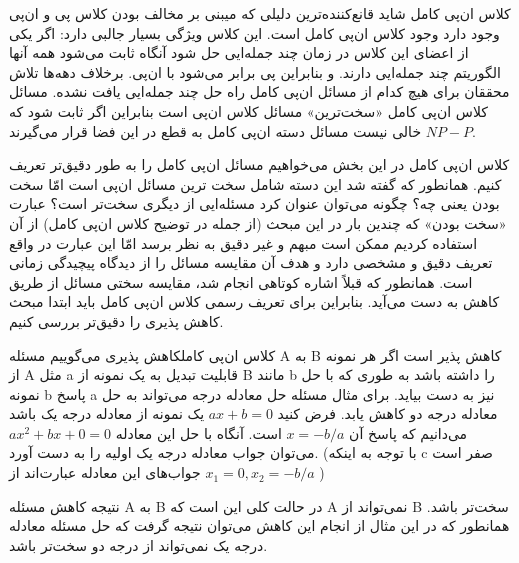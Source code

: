 \begin{itemframe}{کلاس ان‌پی کامل}
\itm
شاید قانع‌کننده‌ترین دلیلی که میبنی بر مخالف بودن کلاس پی و ان‌پی وجود دارد وجود کلاس ان‌پی کامل است. این کلاس ویژگی بسیار جالبی دارد: اگر یکی از اعضای این کلاس در زمان چند جمله‌ایی حل شود آنگاه ثابت می‌شود همه آنها الگوریتم چند جمله‌ایی دارند. و بنابراین پی برابر می‌شود با ان‌پی.
\itm
برخلاف دهه‌ها تلاش محققان برای هیچ کدام از مسائل ان‌پی کامل راه حل چند جمله‌ایی یافت نشده.
\itm
مسائل کلاس ان‌پی کامل «سخت‌ترین» مسائل کلاس ان‌پی است بنابراین اگر ثابت شود که
$NP - P$
خالی نیست مسائل دسته ان‌پی کامل به قطع در این فضا قرار می‌گیرند.

\end{itemframe}


\begin{itemframe}{کلاس ان‌پی کامل}
\itm
در این بخش می‌خواهیم مسائل ان‌پی کامل را به طور دقیق‌تر تعریف کنیم. همانطور که گفته شد این دسته شامل سخت ترین مسائل ان‌پی است امّا سخت بودن یعنی چه؟ چگونه می‌توان عنوان کرد مسئله‌ایی از دیگری سخت‌تر است؟
\itm
عبارت «سخت‌ بودن»
که چندین بار در این مبحث (از جمله در توضیح کلاس ان‌پی کامل) از آن استفاده کردیم ممکن است مبهم و غیر دقیق به نظر برسد امّا این عبارت در واقع تعریف دقیق و مشخصی دارد و هدف آن مقایسه مسائل را از دیدگاه پیچیدگی زمانی است.
\itm
همانطور که قبلاً اشاره کوتاهی انجام شد، مقایسه سختی مسائل  از طریق کاهش به دست می‌آید. بنابراین برای تعریف رسمی کلاس ان‌پی کامل باید ابتدا مبحث کاهش پذیری را دقیق‌تر بررسی کنیم.
\end{itemframe}


\begin{itemframe-s}{کلاس ان‌پی کامل}{کاهش پذیری}
\itm
می‌گوییم مسئله A به B کاهش پذیر
 است اگر هر نمونه از A مثل a قابلیت تبدیل به یک نمونه از B مانند b را داشته باشد به طوری که با حل نمونه b پاسخ a نیز به دست بیاید.
\itm
برای مثال مسئله حل معادله درجه می‌تواند به حل معادله درجه دو کاهش یابد. فرض کنید $ax+b=0$ یک نمونه از معادله درجه یک باشد می‌دانیم که پاسخ آن
$ x = -b/a $
است.
آنگاه با حل این معادله $ ax^2+bx+0=0 $ می‌توان جواب معادله درجه یک اولیه را به دست آورد. (با توجه به اینکه c صفر است جواب‌های این معادله عبارت‌اند از
$ x_1 = 0, x_2= -b/a $
)

\itm
نتیجه کاهش مسئله A به B در حالت کلی این است که A نمی‌تواند از B سخت‌تر باشد. همانطور که در این مثال از انجام این کاهش می‌توان نتیجه گرفت که حل مسئله معادله درجه یک نمی‌تواند از درجه دو سخت‌تر باشد.
\end{itemframe-s}


